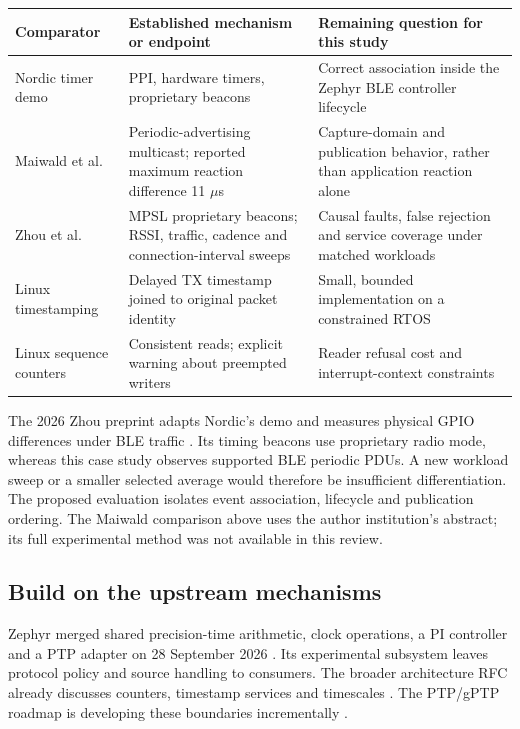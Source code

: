 \documentclass[10pt,letterpaper]{article}
\begin{document}
\begin{center}\small
\begin{tabular}{L{.27\linewidth}L{.32\linewidth}L{.32\linewidth}}\toprule
Comparator & Established mechanism or endpoint & Remaining question for this study\\\midrule
Nordic timer demo \cite{nordic} & PPI, hardware timers, proprietary beacons & Correct association inside the Zephyr BLE controller lifecycle\\
Maiwald et al.\ \cite{maiwald} & Periodic-advertising multicast; reported maximum reaction difference 11 $\mu$s & Capture-domain and publication behavior, rather than application reaction alone\\
Zhou et al.\ \cite{zhou} & MPSL proprietary beacons; RSSI, traffic, cadence and connection-interval sweeps & Causal faults, false rejection and service coverage under matched workloads\\
Linux timestamping \cite{stamp} & Delayed TX timestamp joined to original packet identity & Small, bounded implementation on a constrained RTOS\\
Linux sequence counters \cite{seq} & Consistent reads; explicit warning about preempted writers & Reader refusal cost and interrupt-context constraints\\\bottomrule
\end{tabular}
\end{center}
\vspace{-4pt}
The 2026 Zhou preprint adapts Nordic's demo and measures physical GPIO differences under BLE traffic \cite{zhou}. Its timing beacons use proprietary radio mode, whereas this case study observes supported BLE periodic PDUs. A new workload sweep or a smaller selected average would therefore be insufficient differentiation. The proposed evaluation isolates event association, lifecycle and publication ordering. The Maiwald comparison above uses the author institution's abstract; its full experimental method was not available in this review.

\subsection{Build on the upstream mechanisms}
Zephyr merged shared precision-time arithmetic, clock operations, a PI controller and a PTP adapter on 28 September 2026 \cite{precision,stage2}. Its experimental subsystem leaves protocol policy and source handling to consumers. The broader architecture RFC already discusses counters, timestamp services and timescales \cite{architecture}. The PTP/gPTP roadmap is developing these boundaries incrementally \cite{roadmap}.
\end{document}
